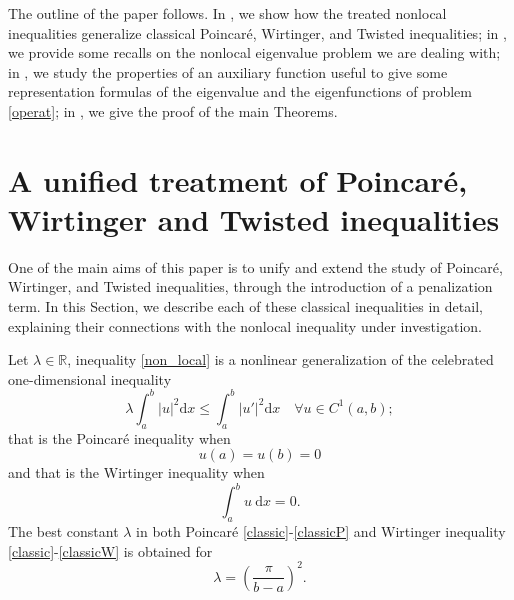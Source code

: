 \documentclass{amsart}
\theoremstyle{definition}
\theoremstyle{remark}
\newcommand{\R}{\mathbb{R}}
\begin{document}
The outline of the paper follows. In , we show how the treated nonlocal inequalities generalize classical Poincaré, Wirtinger, and Twisted inequalities; in , we provide some recalls on the nonlocal eigenvalue problem we are dealing with; in , we study the properties of an auxiliary function useful to give some representation formulas of the eigenvalue and the eigenfunctions of problem \eqref{operat}; in , we give the proof of the main Theorems.%




\section{A unified treatment of Poincar\'e, Wirtinger and Twisted inequalities}
\label{sec_unified}

One of the main aims of this paper is to unify and extend the study of Poincaré, Wirtinger, and Twisted inequalities, through the introduction of a penalization term. In this Section, we describe each of these classical inequalities in detail, explaining their connections with the nonlocal inequality under investigation.

Let $\lambda\in\R$, inequality \eqref{non_local} is a nonlinear generalization of the celebrated one-dimensional inequality
\begin{equation}
\label{classic}
\lambda\int_a^b|u|^2\text{d}x\leq \int_a^b|u'|^2\text{d}x\quad\forall u \in C^1(a,b);
\end{equation}
that is the Poincar\'e inequality when 
\begin{equation}
\label{classicP}
u(a)=u(b)=0
\end{equation}
and that is the Wirtinger inequality when 
\begin{equation}
\label{classicW}
\int_a^bu\ \text{d}x=0.
\end{equation}
The best constant $\lambda$  in both Poincar\'e \eqref{classic}-\eqref{classicP} and Wirtinger inequality \eqref{classic}-\eqref{classicW} is obtained for 
\[
\lambda=\left(\frac\pi{b-a}\right)^2.
\] 
\end{document}
